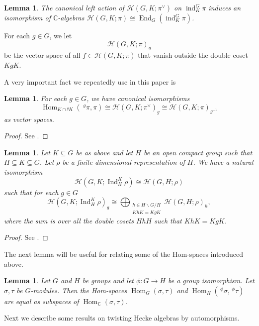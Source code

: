 \documentclass[10pt, letterpaper]{amsart}
\theoremstyle{plain}
\newtheorem{Lem}[equation]{Lemma}
\theoremstyle{definition}
\numberwithin{equation}{section}
\newcommand{\Ind}{\operatorname{Ind}}
\newcommand{\ind}{\operatorname{ind}}
\newcommand{\End}{\operatorname{End}}
\newcommand{\Hom}{\operatorname{Hom}}
\newcommand{\Hcal}{\mathcal{H}}
\begin{document}
\begin{Lem}\label{HeckeAsEnd}
    The canonical left action of $\Hcal(G, K; \pi^\vee)$ on $\ind_{K}^{G}\pi$ induces an isomorphism of $\mathbb{C}$-algebras $\Hcal(G, K; \pi)\cong \End_{G}(\ind_{K}^{G}\pi)$. 
\end{Lem}

For each $g\in G$, we let
\[
\Hcal(G, K; \pi)_g
\]
be the vector space of all $f\in \Hcal(G, K; \pi)$ that vanish outside the double coset $KgK$.

A very important fact we repeatedly use in this paper is 
\begin{Lem}\label{L:Bushnell_Kutzko_equivalence}
For each $g\in G$, we have canonical isomorphisms
\[
\Hom_{K\cap{^gK}}(\;{^g\pi},\pi)\cong\Hcal(G, K; \pi^\vee)_g\cong\Hcal(G, K; \pi)_{g^{-1}}
\]
as vector spaces.
\end{Lem}
\begin{proof}
See \cite[(4.1.1) Proposition, p.144]{Bushnell-Kutzko-Book}.
\end{proof}


\begin{Lem}\label{L:Bushnell_Kutzko_induced}
Let $K\subseteq G$ be as above and let $H$ be an open compact group such that $H\subseteq K\subseteq G$. Let $\rho$ be a finite dimensional representation of $H$. We have a natural isomorphism
\[
\Hcal(G, K; \Ind_H^K\rho)\cong \Hcal(G, H; \rho)
\]
such that for each $g\in G$
\[
\Hcal(G, K; \Ind_H^K\rho)_g\cong\bigoplus_{\substack{h\in H\backslash G \slash H\\KhK=KgK}} \Hcal(G, H; \rho)_h,
\]
where the sum is over all the double cosets $HhH$ such that $KhK=KgK$.
\end{Lem}
\begin{proof}
See \cite[(4.1.5) Corollary, p.146]{Bushnell-Kutzko-Book}.
\end{proof}

The next lemma will be useful for relating some of the Hom-spaces introduced above.

\begin{Lem}\label{HomIsoRel}
	Let $G$  and $H$ be groups and let $\phi:G\rightarrow H$ be a group isomorphism. Let $\sigma,\tau$ be $G$-modules. Then the Hom-spaces $\Hom_{G}(\sigma,\tau)$ and $\Hom_{H}(\,^{\phi}\sigma,\,^{\phi}\tau)$ are equal as subspaces of $\Hom_{\mathbb{C}}(\sigma,\tau)$.
\end{Lem}

Next we describe some results on twisting Hecke algebras by automorphisms.
\end{document}
